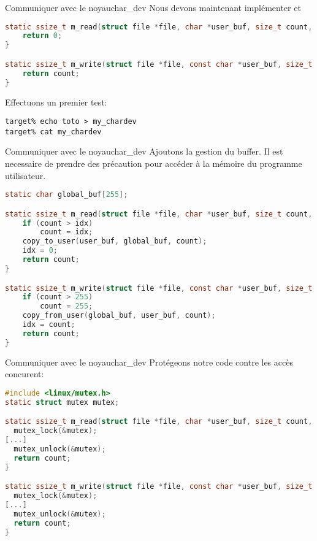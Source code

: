 \begin{frame}[fragile=singleslide]{Communiquer avec le noyau}{char\_dev}
Nous devons maintenant implémenter  et 
  \begin{lstlisting}[language=c]
static ssize_t m_read(struct file *file, char *user_buf, size_t count, loff_t *ppos) {
    return 0;
}

static ssize_t m_write(struct file *file, const char *user_buf, size_t count, loff_t *ppos) {
    return count;
}
  \end{lstlisting}
Effectuons un premier test:
  \begin{lstlisting}
target% echo toto > my_chardev
target% cat my_chardev
  \end{lstlisting}
\end{frame}

\begin{frame}[fragile=singleslide]{Communiquer avec le noyau}{char\_dev}
Ajoutons la gestion du buffer. Il est necessaire de prendre des précaution pour 
accéder à la mémoire du programme utilisateur.
  \begin{lstlisting}[language=c]
static char global_buf[255];

static ssize_t m_read(struct file *file, char *user_buf, size_t count, loff_t *ppos) {
    if (count > idx)
        count = idx;
    copy_to_user(user_buf, global_buf, count);
    idx = 0;
    return count;
}

static ssize_t m_write(struct file *file, const char *user_buf, size_t count, loff_t *ppos) {
    if (count > 255)
        count = 255;
    copy_from_user(global_buf, user_buf, count);
    idx = count;
    return count;
}
  \end{lstlisting}
\end{frame}

\begin{frame}[fragile=singleslide]{Communiquer avec le noyau}{char\_dev}
Protégeons notre code contre les accès concurent:
  \begin{lstlisting}[language=c]
#include <linux/mutex.h>
static struct mutex mutex;

static ssize_t m_read(struct file *file, char *user_buf, size_t count, loff_t *ppos) {
  mutex_lock(&mutex);
[...]
  mutex_unlock(&mutex);
  return count;
}

static ssize_t m_write(struct file *file, const char *user_buf, size_t count, loff_t *ppos) {
  mutex_lock(&mutex);
[...]
  mutex_unlock(&mutex);
  return count;
}
  \end{lstlisting}
\end{frame}

